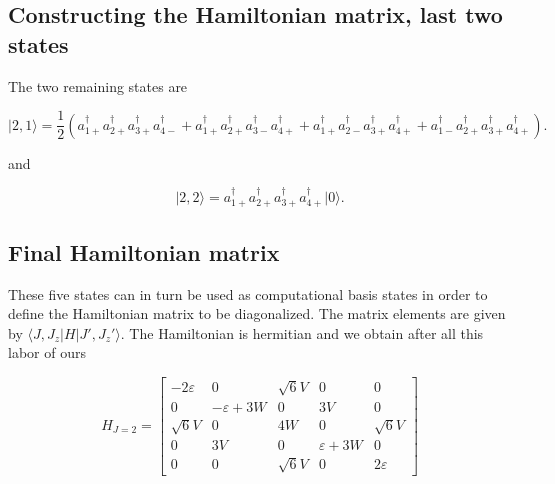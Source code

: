 \documentclass[11pt]{article}
\begin{document}
    \hypertarget{constructing-the-hamiltonian-matrix-last-two-states}{%
\subsection{Constructing the Hamiltonian matrix, last two
states}\label{constructing-the-hamiltonian-matrix-last-two-states}}

The two remaining states are

    \hypertarget{eq:2ux2c1}{}

\[
\begin{equation}
\vert2,1\rangle  = \frac{1}{2} \left(
a_{1+}^{\dagger} a_{2+}^{\dagger} a_{3+}^{\dagger} a_{4-}^{\dagger} +
a_{1+}^{\dagger} a_{2+}^{\dagger} a_{3-}^{\dagger} a_{4+}^{\dagger} +
a_{1+}^{\dagger} a_{2-}^{\dagger} a_{3+}^{\dagger} a_{4+}^{\dagger} +
a_{1-}^{\dagger} a_{2+}^{\dagger} a_{3+}^{\dagger} a_{4+}^{\dagger}
 \right).
\label{eq:2,1} \tag{25}
\end{equation}
\]

    and

    \hypertarget{eq:2ux2c2}{}

\[
\begin{equation}
\vert 2,2\rangle  = a_{1+}^{\dagger} a_{2+}^{\dagger} a_{3+}^{\dagger} a_{4+}^{\dagger} \vert 0\rangle.
\label{eq:2,2} \tag{26}
\end{equation}
\]

    \hypertarget{final-hamiltonian-matrix}{%
\subsection{Final Hamiltonian matrix}\label{final-hamiltonian-matrix}}

These five states can in turn be used as computational basis states in
order to define the Hamiltonian matrix to be diagonalized. The matrix
elements are given by \(\langle J,J_z \vert H \vert J',J_z' \rangle\).
The Hamiltonian is hermitian and we obtain after all this labor of ours

    \hypertarget{eq:HJ=2}{}

\[
\begin{equation}
H_{J = 2} =
\begin{bmatrix}
-2\varepsilon & 0 & \sqrt{6}V & 0 & 0 \\
0 & -\varepsilon + 3W & 0 & 3V & 0 \\
\sqrt{6}V & 0 & 4W & 0 & \sqrt{6}V \\
0 & 3V & 0 & \varepsilon + 3W & 0 \\
0 & 0 & \sqrt{6}V & 0 & 2\varepsilon
\end{bmatrix}
\label{eq:HJ=2} \tag{27}
\end{equation}
\]
\end{document}
